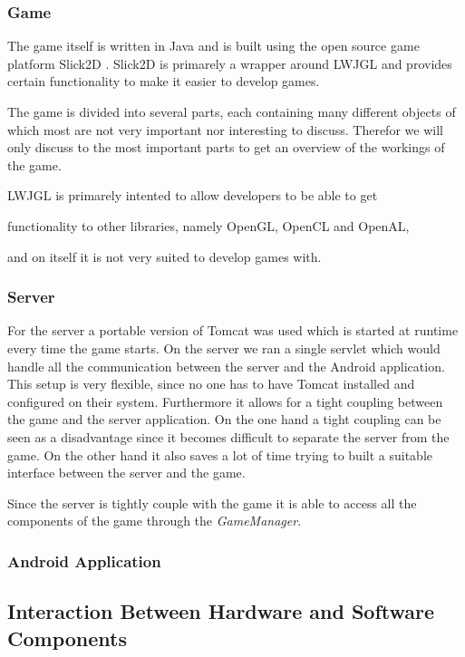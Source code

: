 \documentclass[a4paper,10pt]{article}
\begin{document}
		\subsubsection{Game}
		The game itself is written in Java and is built using the open source game platform Slick2D \cite{Slick2D}.
		Slick2D is primarely a wrapper around LWJGL \cite{LWJGL} and provides certain functionality to make it easier to develop games.
		
		The game is divided into several parts, each containing many different objects of which most are not very important nor interesting to discuss.
		Therefor we will only discuss to the most important parts to get an overview of the workings of the game.
		
		
		LWJGL is primarely intented to allow developers to be able to get 
		
		functionality to other libraries, namely OpenGL, OpenCL and OpenAL, 
		
		and on itself it is not very suited to develop games with.
		
		
		\subsubsection{Server}
		For the server a portable version of Tomcat was used which is started at runtime every time the game starts.
		On the server we ran a single servlet which would handle all the communication between the server and the Android application.
		This setup is very flexible, since no one has to have Tomcat installed and configured on their system.
		Furthermore it allows for a tight coupling between the game and the server application.
		On the one hand a tight coupling can be seen as a disadvantage since it becomes difficult to separate the server from the game.
		On the other hand it also saves a lot of time trying to built a suitable interface between the server and the game.
				
		Since the server is tightly couple with the game it is able to access all the components of the game through the \emph{GameManager}.
		
		\subsubsection{Android Application}
		
	\subsection{Interaction Between Hardware and Software Components}
\end{document}
